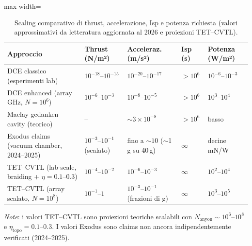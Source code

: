 \documentclass[11pt,a4paper]{article}
\theoremstyle{plain}
\theoremstyle{definition}
\begin{document}
\begin{table}[H]
\centering
\caption{Scaling comparativo di thrust, accelerazione, Isp e potenza richiesta (valori approssimativi da letteratura aggiornata al 2026 e proiezioni TET--CVTL).}
\small
\arrayrulewidth=0.6pt
\begin{adjustbox}{max width=\textwidth}
\begin{tabularx}{\textwidth}{
  | >{\raggedright\arraybackslash}p{5.5cm}   %
  | >{\centering\arraybackslash}X             %
  | >{\centering\arraybackslash}X             %
  | >{\centering\arraybackslash}X             %
  | >{\centering\arraybackslash}X  |           %
}
\hline
\textbf{Approccio} & \textbf{Thrust (N/m²)} & \textbf{Acceleraz. (m/s²)} & \textbf{Isp (s)} & \textbf{Potenza (W/m²)} \\
\hline
DCE classico (esperimenti lab) 
    & $10^{-18}$--$10^{-15}$ 
    & $10^{-20}$--$10^{-17}$ 
    & $>10^6$ 
    & $10^{-6}$--$10^{-3}$ \\
\hline
DCE enhanced (array GHz, $N=10^6$) 
    & $10^{-6}$--$10^{-3}$ 
    & $10^{-8}$--$10^{-5}$ 
    & $>10^6$ 
    & $10^3$--$10^4$ \\
\hline
Maclay gedanken cavity (teorico) 
    & -- 
    & $\sim 3\times10^{-8}$ 
    & $>10^6$ 
    & basso \\
\hline
Exodus claims (vacuum chamber, 2024–2025) 
    & $10^{-3}$--$10^{-1}$ (scalato) 
    & fino a $\sim 10$ ($\sim$1\,g su 40\,g) 
    & $\infty$ 
    & decine mN/W \\
\hline
TET--CVTL (lab-scale, braiding + $\eta=0.1$–$0.3$) 
    & $10^{-4}$--$10^{-2}$ 
    & $10^{-6}$--$10^{-3}$ 
    & $\infty$ 
    & $10^2$--$10^4$ \\
\hline
TET--CVTL (array scalato, $N=10^8$) 
    & $10^{-1}$--$1$ 
    & $10^{-3}$--$10^{-1}$ (frazioni di g) 
    & $\infty$ 
    & $10^3$--$10^5$ \\
\hline
\end{tabularx}
\end{adjustbox}
\vspace{0.5em}

\vspace{0.3cm}

{\normalsize
\textit{Note}: i valori TET--CVTL sono proiezioni teoriche scalabili con $N_{\mathrm{anyon}} \sim 10^6$--$10^8$ e $\eta_{\mathrm{topo}} = 0.1$–$0.3$. I valori Exodus sono claims non ancora indipendentemente verificati (2024–2025).
}
\label{tab:scaling-comparative}
\end{table}
\end{document}
